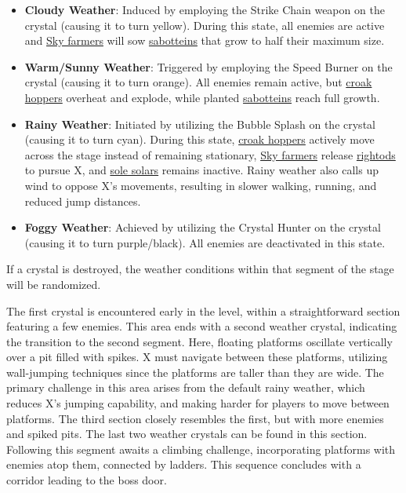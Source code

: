 \begin{itemize}
\item \textbf{Cloudy Weather}: Induced by employing the Strike Chain weapon on the crystal (causing it to turn yellow). During this state, all enemies are active and \hyperlink{enem:Sky_Farmer}{Sky farmers} will sow \hyperlink{enem:Sabottein}{sabotteins} that grow to half their maximum size.

\item \textbf{Warm/Sunny Weather}: Triggered by employing the Speed Burner on the crystal (causing it to turn orange). All enemies remain active, but \hyperlink{enem:Croak_hopper}{croak hoppers} overheat and explode, while planted \hyperlink{enem:Sabottein}{sabotteins} reach full growth.

\item \textbf{Rainy Weather}: Initiated by utilizing the Bubble Splash on the crystal (causing it to turn cyan). During this state, \hyperlink{enem:Croak_hopper}{croak hoppers} actively move across the stage instead of remaining stationary, \hyperlink{enem:Sky_Farmer}{Sky farmers} release \hyperlink{enem:Rightod}{rightods} to pursue X, and \hyperlink{enem:Sole_solar}{sole solars} remains inactive. Rainy weather also calls up wind to oppose X's movements, resulting in slower walking, running, and reduced jump distances.

\item \textbf{Foggy Weather}: Achieved by utilizing the Crystal Hunter on the crystal (causing it to turn purple/black). All enemies are deactivated in this state.
\end{itemize}

If a crystal is destroyed, the weather conditions within that segment of the stage will be randomized.

The first crystal is encountered early in the level, within a straightforward section featuring a few enemies. This area ends with a second weather crystal, indicating the transition to the second segment. Here, floating platforms oscillate vertically over a pit filled with spikes. X must navigate between these platforms, utilizing wall-jumping techniques since the platforms are taller than they are wide. The primary challenge in this area arises from the default rainy weather, which reduces X's jumping capability, and making harder for players to move between platforms. The third section closely resembles the first, but with more enemies and spiked pits. The last two weather crystals can be found in this section. Following this segment awaits a climbing challenge, incorporating platforms with enemies atop them, connected by ladders. This sequence concludes with a corridor leading to the boss door.

